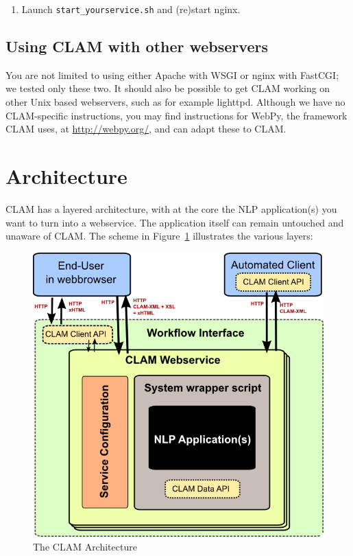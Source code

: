 \documentclass[a4paper,12pt]{report}
\begin{document}
\begin{enumerate}
\begin{verbatim}
 location /static/ {
    root /path/to/clam;
    if (-f $request_filename) {
       rewrite ^/static/(.*)$  /static/$1 break;
    }
 }
\end{verbatim}
\item Launch \texttt{start\_yourservice.sh}  and (re)start nginx.
\end{enumerate}


\subsection{Using CLAM with other webservers}

You are not limited to using either Apache with WSGI or nginx with FastCGI; we tested only these two. It should also be possible to get CLAM working on other Unix based webservers, such as for example lighttpd. Although we have no CLAM-specific instructions, you may find instructions for WebPy, the framework CLAM uses, at \url{http://webpy.org/}, and can adapt these to CLAM.

\section{Architecture}

CLAM has a layered architecture, with at the core the NLP application(s) you want to turn into a webservice. The application itself can remain untouched and unaware of CLAM. The scheme in Figure~\ref{fig:arch} illustrates the various layers:

\begin{figure}[h]
\begin{center}
\includegraphics[width=130.0mm]{architecture.png}
\end{center}
\caption{The CLAM Architecture}
\label{fig:arch} 
\end{figure}
\end{document}
